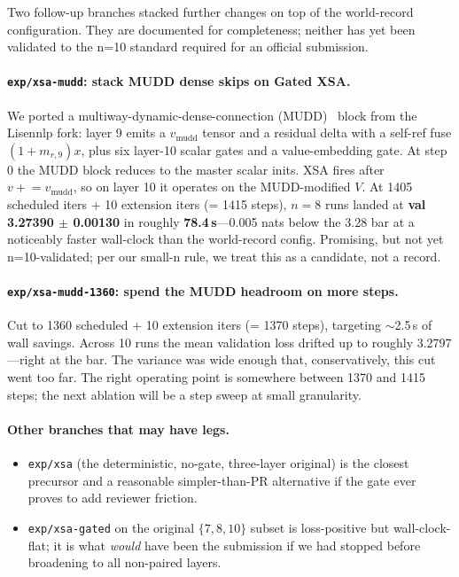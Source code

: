 \documentclass[10pt,letterpaper]{article}
\newcommand{\code}[1]{\texttt{\small #1}}
\newcommand{\val}[1]{\textbf{#1}}
\begin{document}
Two follow-up branches stacked further changes on top of the world-record configuration. They are documented for completeness; neither has yet been validated to the n=10 standard required for an official submission.

\paragraph{\code{exp/xsa-mudd}: stack MUDD dense skips on Gated XSA.} We ported a multiway-dynamic-dense-connection (MUDD)~\cite{mudd_residual} block from the Lisennlp fork: layer 9 emits a $v_{\text{mudd}}$ tensor and a residual delta with a self-ref fuse $(1+m_{r,9})x$, plus six layer-10 scalar gates and a value-embedding gate. At step 0 the MUDD block reduces to the master scalar inits. XSA fires after $v\!+\!=\!v_{\text{mudd}}$, so on layer 10 it operates on the MUDD-modified $V$. At 1405 scheduled iters + 10 extension iters (= 1415 steps), $n=8$ runs landed at \val{val 3.27390 \(\pm\) 0.00130} in roughly \val{78.4\,s}---0.005 nats below the 3.28 bar at a noticeably faster wall-clock than the world-record config. Promising, but not yet n=10-validated; per our small-n rule, we treat this as a candidate, not a record.

\paragraph{\code{exp/xsa-mudd-1360}: spend the MUDD headroom on more steps.} Cut to 1360 scheduled + 10 extension iters (= 1370 steps), targeting $\sim$2.5\,s of wall savings. Across 10 runs the mean validation loss drifted up to roughly 3.2797---right at the bar. The variance was wide enough that, conservatively, this cut went too far. The right operating point is somewhere between 1370 and 1415 steps; the next ablation will be a step sweep at small granularity.

\paragraph{Other branches that may have legs.}
\begin{itemize}[leftmargin=1.2em,itemsep=0pt]
  \item \code{exp/xsa} (the deterministic, no-gate, three-layer original) is the closest precursor and a reasonable simpler-than-PR alternative if the gate ever proves to add reviewer friction.
  \item \code{exp/xsa-gated} on the original $\{7,8,10\}$ subset is loss-positive but wall-clock-flat; it is what \emph{would} have been the submission if we had stopped before broadening to all non-paired layers.
\end{itemize}
\end{document}
